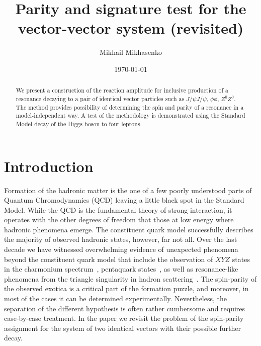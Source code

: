 \documentclass[prd,preprintnumbers,floatfix,
nofootinbib,superscriptaddress]{revtex4}
\begin{document}
\title{Parity and signature test for the vector-vector system (revisited)}

\author{Mikhail Mikhasenko}

\date{\today}

\begin{abstract}
  We present a construction of the reaction amplitude
  for inclusive production of a resonance decaying to a pair of identical vector particles such as $J/\psi J/\psi$, $\phi\phi$, $Z^0 Z^0$.
  The method provides possibility of determining the spin and parity of a resonance in a model-independent way.
  A test of the methodology is demonstrated using the Standard Model decay of the Higgs boson to four leptons.
\end{abstract}

\nopagebreak
\maketitle

%
\newcommand{\mishatodo}[1]{\todo[inline,backgroundcolor=colb!50!white]{\textbf{Misha:} #1}}
\newcommand{\misha}[1]{{\color{colb} \textit{Misha:} #1}\xspace}
%

\section{Introduction}

Formation of the hadronic matter is the one of a few poorly understood parts of Quantum Chromodynamics (QCD) leaving a little black spot in the Standard Model.
While the QCD is the fundamental theory of strong interaction,
it operates with the other degrees of freedom that those at low energy where hadronic phenomena emerge.
The constituent quark model successfully describes the majority of observed hadronic states, however, far not all.
Over the last decade we have witnessed overwhelming evidence of unexpected phenomena beyond the constituent quark model that
include the observation of $XYZ$ states in the charmonium spectrum~\cite{Godfrey:2008nc}, pentaquark states~\cite{Aaij:2015tga,Aaij:2019vzc},
as well as resonance-like phenomena from the triangle singularity in hadron scattering~\cite{Alexeev:2020lvq}.
The spin-parity of the observed exotica is a critical part of the formation puzzle, and moreover, in most of the cases it can be determined experimentally.
Nevertheless, the separation of the different hypothesis is often rather cumbersome and requires case-by-case treatment.
In the paper we revisit the problem of the spin-parity assignment for the system of two identical vectors with their possible further decay.
\end{document}
